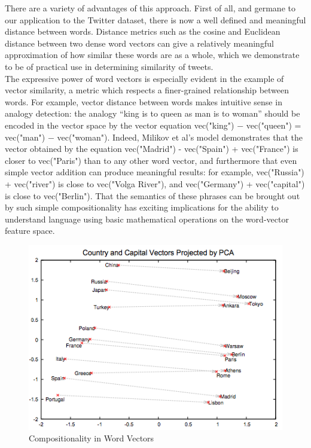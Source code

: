 \documentclass[conference]{IEEEtran}
\begin{document}
\indent There are a variety of advantages of this approach.  First of all, and germane to our application to the Twitter dataset, there is now a well defined and meaningful distance between words.  Distance metrics such as the cosine and Euclidean distance between two dense word vectors can give a relatively meaningful approximation of how similar these words are as a whole, which we demonstrate to be of practical use in determining similarity of tweets.\\

\indent The expressive power of word vectors is especially evident in the example of vector similarity, a metric which respects a finer-grained relationship between words. For example, vector distance between words makes intuitive sense in analogy detection: the analogy “king is to queen as man is to woman” should be encoded in the vector space by the vector equation vec("king") − vec("queen") = vec("man") − vec("woman").  Indeed, Milikov et al's model demonstrates that the vector obtained by the equation vec("Madrid") - vec("Spain") + vec("France") is closer to vec("Paris") than to any other word vector, and furthermore that even simple vector addition can produce meaningful results: for example, vec("Russia") + vec("river") is close to vec("Volga River"), and vec("Germany") + vec("capital") is close to vec("Berlin"). That the semantics of these phrases can be brought out by such simple compositionality has exciting implications for the ability to understand language using basic mathematical operations on the word-vector feature space.\\

\begin{figure}
	\centering
	\includegraphics[scale=0.5]{compositionality.png}
	\caption{Compositionality in Word Vectors}
	\label{fig1}
\end{figure}
\end{document}

